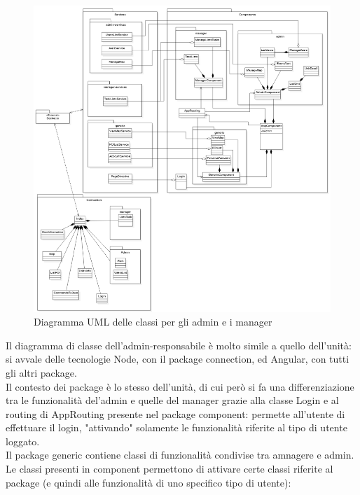 \begin{figure}[H]
	\centering
	\includegraphics[scale=0.6]{res/images/UML_admin-manager.png}
	\caption{Diagramma UML delle classi per gli admin e i manager}
\end{figure}
Il diagramma di classe dell'admin-responsabile è molto simile a quello dell'unità: si avvale delle tecnologie Node, con il package connection, ed Angular, con tutti gli altri package.\\
Il contesto dei package è lo stesso dell'unità, di cui però si fa una differenziazione tra le funzionalità del'admin e quelle del manager grazie alla classe Login e al routing di AppRouting presente nel package component: permette all'utente di effettuare il login, "attivando" solamente le funzionalità riferite al tipo di utente loggato.\\
Il package generic contiene classi di funzionalità condivise tra amnagere e admin.\\
Le classi presenti in component permettono di attivare certe classi riferite al package (e quindi alle funzionalità di uno specifico tipo di utente):
